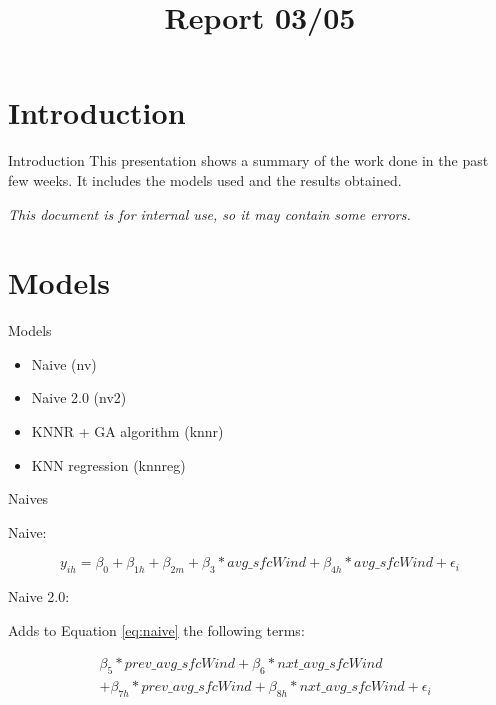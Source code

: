 \documentclass[xcolor=dvipsnames]{beamer}
\title[Report 03/05]{Report 03/05}
\begin{document}
	
	\begin{frame}
		\titlepage
	\end{frame}
	

	\section{Introduction}

	\begin{frame}{Introduction}
        This presentation shows a summary of the work done in the past few weeks. It includes the models used and the results obtained.
        

        \textit{This document is for internal use, so it may contain some errors.}

	\end{frame}

    \section{Models}


    \begin{frame}{Models}

        \begin{itemize}
            \item Naive (nv)
            \item Naive 2.0 (nv2)
            \item KNNR + GA algorithm (knnr)
            \item KNN regression (knnreg)
        \end{itemize}

    \end{frame}

    \begin{frame}{Naives}

        Naive:

        \begin{equation}\label{eq:naive}
            y_{ih} = \beta_0 + \beta_{1h} + \beta_{2m} + \beta_3*avg\_sfcWind + \beta_{4h}*avg\_sfcWind + \epsilon_i 
        \end{equation}

        Naive 2.0:

        \vspace{0.5em}

        \qquad Adds to Equation \ref{eq:naive} the following terms:

        \begin{equation}
            \begin{split}
                & \beta_5*prev\_avg\_sfcWind + \beta_{6}*nxt\_avg\_sfcWind \\
                &  +  \beta_{7h}*prev\_avg\_sfcWind +  \beta_{8h}*nxt\_avg\_sfcWind + \epsilon_i 
            \end{split}
        \end{equation}
                        
    

    \end{frame}
\end{document}
